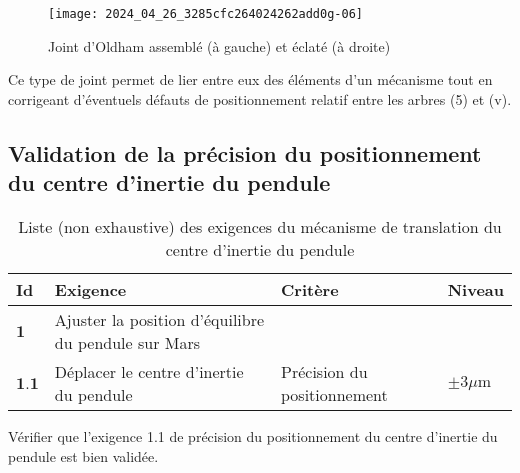 \begin{figure}[!h]
\centering
\texttt{[image: 2024\_04\_26\_3285cfc264024262add0g-06]}
\caption{\label{ccmp2023_fig_07} Joint d'Oldham assemblé (à gauche) et éclaté (à droite)}
\end{figure}



Ce type de joint permet de lier entre eux des éléments d'un mécanisme tout en corrigeant d'éventuels défauts de positionnement relatif entre les arbres (5) et (v).




\subsection{Validation de la précision du positionnement du centre d'inertie du pendule}

\begin{table}[!h]
\centering
\begin{tabular}{llll}
\hline
Id & Exigence & Critère & Niveau \\
\hline
$\mathbf{1}$ & Ajuster la position d'équilibre du pendule sur Mars &  &  \\
\hline
$\mathbf{1 . 1}$ & Déplacer le centre d'inertie du pendule & Précision du positionnement & $\pm 3 \mu \mathrm{m}$ \\
\hline
\end{tabular}
\caption{\label{ccmp2023_tab_01} Liste (non exhaustive) des exigences du mécanisme de translation du centre d'inertie du pendule}
\end{table}

\begin{obj}
Vérifier que l'exigence 1.1 de précision du positionnement du centre d'inertie du pendule est bien validée.
\end{obj}

